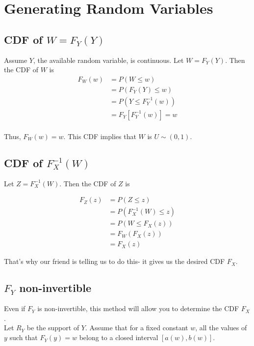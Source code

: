 \documentclass[paper=a4, fontsize=11pt]{scrartcl} %
\numberwithin{equation}{section} %
\numberwithin{figure}{section} %
\numberwithin{table}{section} %
\begin{document}
\section{Generating Random Variables}

\subsection{CDF of $W = F_Y(Y)$}

Assume $Y$, the available random variable, is continuous. Let $W = F_Y(Y)$. Then the CDF of $W$ is
\begin{align*}
F_W(w)& = P(W \leq w)\\
   &= P(F_Y(Y) \leq w)\\
   &= P(Y \leq F_Y^{-1}(w))\\
   &= F_Y[F_Y^{-1}(w)]=w\\
\end{align*}

Thus, $F_W(w) = w$. This CDF implies that $W$ is $U \sim (0,1)$.

\subsection{CDF of $F_X^{-1}(W)$}

Let $Z = F_X^{-1}(W)$. Then the CDF of $Z$ is

\begin{align*}
F_Z(z)&= P(Z \leq z)\\
   &= P(F_X^{-1}(W) \leq z)\\
   &= P(W \leq F_X(z))\\
   &= F_W(F_X(z))\\
   &= F_X(z)
\end{align*}

That's why our friend is telling us to do this- it gives us the desired CDF $F_X$. 

\subsection{$F_Y$ non-invertible}

Even if $F_Y$ is non-invertible, this method will allow you to determine the CDF $F_X$.\\

Let $R_Y$ be the support of $Y$. Assume that for a fixed constant $w$, all the values of $y$ such that $F_Y(y) = w$ belong to a closed interval $[a(w),b(w)]$.\\
\end{document}
